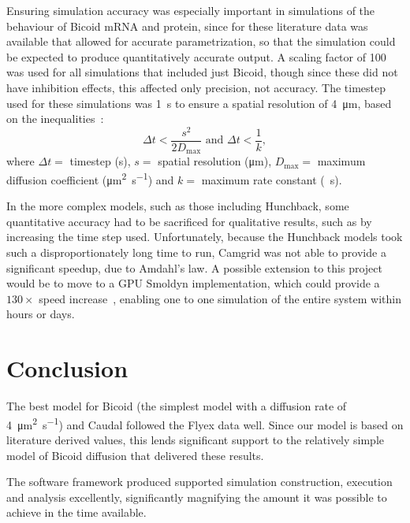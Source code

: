 \documentclass[11pt,a4paper,twocolumn]{article}
\begin{document}
Ensuring simulation accuracy was especially important in simulations of the behaviour of Bicoid mRNA and protein, since for these literature data was available that allowed for accurate parametrization, so that the simulation could be expected to produce quantitatively accurate output. A scaling factor of \num{100} was used for all simulations that included just Bicoid, though since these did not have inhibition effects, this affected only precision, not accuracy. The timestep used for these simulations was \SI{1}{s} to ensure a spatial resolution of \SI{4}{\micro\metre}, based on the inequalities~\cite{Andrews2011}:
\begin{equation}
\Delta t < \frac{s^2}{2D_\text{max}} \text{ and } \Delta t < \frac{1}{k},
\end{equation}
where \(\Delta t =\) timestep (\si{\second}), \(s =\) spatial resolution (\si{\micro\metre}), \(D_\text{max} =\) maximum diffusion coefficient (\si{\micro\metre\squared\per\second}) and \(k = \) maximum rate constant (\si{\per\second}).

In the more complex models, such as those including Hunchback, some quantitative accuracy had to be sacrificed for qualitative results, such as by increasing the time step used. Unfortunately, because the Hunchback models took such a disproportionately long time to run, Camgrid was not able to provide a significant speedup, due to Amdahl’s law. A possible extension to this project would be to move to a GPU Smoldyn implementation, which could provide a \(130 \times\)  speed increase~\cite{Dematte2010}, enabling one to one simulation of the entire system within hours or days.

\raggedbottom
\section{Conclusion}
The best model for Bicoid (the simplest model with a diffusion rate of \SI{4}{\micro\metre\squared\per\second}) and Caudal followed the Flyex data well. Since our model is based on literature derived values, this lends significant support to the relatively simple model of Bicoid diffusion that delivered these results. 

\nopagebreak
The software framework produced supported simulation construction, execution and analysis excellently, significantly magnifying the amount it was possible to achieve in the time available.

\nocite{*}
\pagebreak[4]


\end{document}
